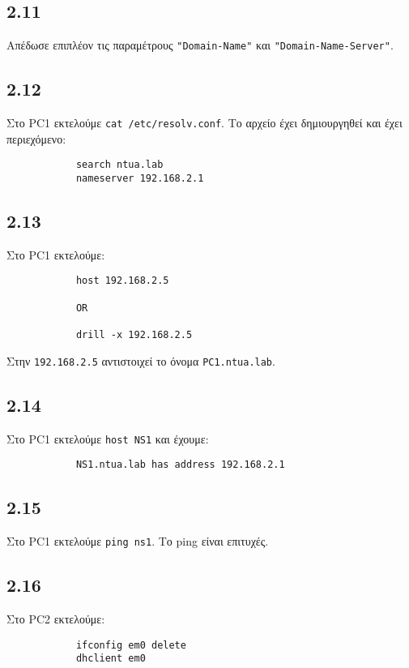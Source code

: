 \documentclass[a4paper, 12pt]{article}
\begin{document}
	\subsection*{2.11}
		Απέδωσε επιπλέον τις παραμέτρους \verb|"Domain-Name"| και \verb|"Domain-Name-Server"|.

	\subsection*{2.12}
		Στο PC1 εκτελούμε \verb|cat /etc/resolv.conf|. Το αρχείο έχει δημιουργηθεί και έχει περιεχόμενο:
		
		\begin{verbatim}
			search ntua.lab
			nameserver 192.168.2.1
		\end{verbatim}

	\subsection*{2.13}
		Στο PC1 εκτελούμε:
		
		\begin{verbatim}
			host 192.168.2.5
			
			OR 
			
			drill -x 192.168.2.5
		\end{verbatim}
		
		Στην \verb|192.168.2.5| αντιστοιχεί το όνομα \verb|PC1.ntua.lab|.

	\subsection*{2.14}
		Στο PC1 εκτελούμε \verb|host NS1| και έχουμε:
		
		\begin{verbatim}
			NS1.ntua.lab has address 192.168.2.1
		\end{verbatim}

	\subsection*{2.15}
		Στο PC1 εκτελούμε \verb|ping ns1|. Το ping είναι επιτυχές.

	\subsection*{2.16}
		Στο PC2 εκτελούμε:
		
		\begin{verbatim}
			ifconfig em0 delete
			dhclient em0
		\end{verbatim}
\end{document}
